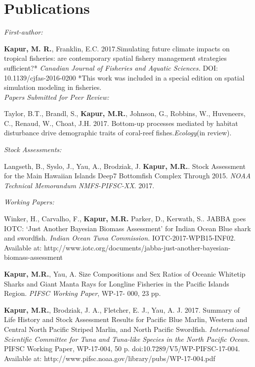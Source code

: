 \documentclass[10pt, letterpaper]{article}
\begin{document}
\section*{Publications}
\noindent \textit{First-author:}

\hangindent=0.5cm \noindent \textbf{Kapur, M. R.}, Franklin, E.C. 2017.Simulating future climate impacts on tropical fisheries: are contemporary spatial fishery management strategies sufficient?*  \textit{Canadian Journal of Fisheries and Aquatic Sciences.}  DOI: 10.1139/cjfas-2016-0200 
*This work was included in a special edition on spatial simulation modeling in fisheries. \\

\noindent \textit{Papers Submitted for Peer Review:} 

\hangindent=0.5cm \noindent Taylor, B.T., Brandl, S., \textbf{Kapur, M.R.},  Johnson, G., Robbins, W., Huveneers, C., Renaud, W., Choat, J.H. 2017.
Bottom-up processes mediated by habitat disturbance drive demographic traits of coral-reef fishes.\textit{Ecology}(in review).\newline

\noindent \textit{Stock Assessments:}

\hangindent=0.5cm \noindent Langseth, B., Syslo, J., Yau, A., Brodziak, J. \textbf{Kapur, M.R.}. Stock Assessment for the Main Hawaiian Islands Deep7 Bottomfish Complex Through 2015. \textit{NOAA Technical Memorandum NMFS-PIFSC-XX}. 2017.  \newline


\noindent \textit{Working Papers:}

\hangindent=0.5cm \noindent Winker, H., Carvalho, F., \textbf{Kapur, M.R.} Parker, D., Kerwath, S.. JABBA goes IOTC: ‘Just Another Bayesian Biomass Assessment’ for Indian Ocean Blue shark and swordfish. \textit{ Indian Ocean Tuna Commission.} IOTC-2017-WPB15-INF02. Available at: http://www.iotc.org/documents/jabba-just-another-bayesian-biomass-assessment 

\hangindent=0.5cm \noindent  \textbf{Kapur, M.R.}, Yau, A. Size Compositions and Sex Ratios of Oceanic Whitetip Sharks and Giant Manta Rays for Longline Fisheries in the Pacific Islands Region. \textit{ PIFSC Working Paper}, WP-17- 000, 23 pp.

\hangindent=0.5cm \noindent  \textbf{Kapur, M.R.},  Brodziak, J. A., Fletcher, E. J., Yau, A. J. 2017. Summary of Life History and Stock Assessment Results for Pacific Blue Marlin, Western and Central North Pacific Striped Marlin, and North Pacific Swordfish. \textit{International Scientific Committee for Tuna and Tuna-like Species in the North Pacific Ocean.} PIFSC Working Paper, WP-17-004, 50 p. doi:10.7289/V5/WP-PIFSC-17-004. Available at: http://www.pifsc.noaa.gov/library/pubs/WP-17-004.pdf
\end{document}
